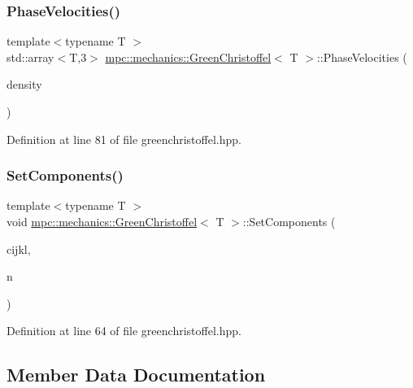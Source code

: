 \subsubsection{\texorpdfstring{Phase\+Velocities()}{PhaseVelocities()}}
{\footnotesize\ttfamily template$<$typename T $>$ \\
std\+::array$<$T,3$>$ \mbox{\hyperlink{structmpc_1_1mechanics_1_1_green_christoffel}{mpc\+::mechanics\+::\+Green\+Christoffel}}$<$ T $>$\+::Phase\+Velocities (\begin{DoxyParamCaption}\item[{T}]{density }\end{DoxyParamCaption})\hspace{0.3cm}{\ttfamily [inline]}}



Definition at line 81 of file greenchristoffel.\+hpp.

\mbox{\label{structmpc_1_1mechanics_1_1_green_christoffel_a82e7d064980bd9885e26b25376a23ad4}} 
\subsubsection{\texorpdfstring{Set\+Components()}{SetComponents()}}
{\footnotesize\ttfamily template$<$typename T $>$ \\
void \mbox{\hyperlink{structmpc_1_1mechanics_1_1_green_christoffel}{mpc\+::mechanics\+::\+Green\+Christoffel}}$<$ T $>$\+::Set\+Components (\begin{DoxyParamCaption}\item[{const \mbox{\hyperlink{structmpc_1_1core_1_1_stiffness_tensor}{mpc\+::core\+::\+Stiffness\+Tensor}}$<$ T $>$ \&}]{cijkl,  }\item[{blitz\+::\+Array$<$ T, 1 $>$ \&}]{n }\end{DoxyParamCaption})\hspace{0.3cm}{\ttfamily [inline]}}



Definition at line 64 of file greenchristoffel.\+hpp.



\subsection{Member Data Documentation}
\mbox{\label{structmpc_1_1mechanics_1_1_green_christoffel_a6d8298d4bd31b188f061c4bd07810c04}} 
